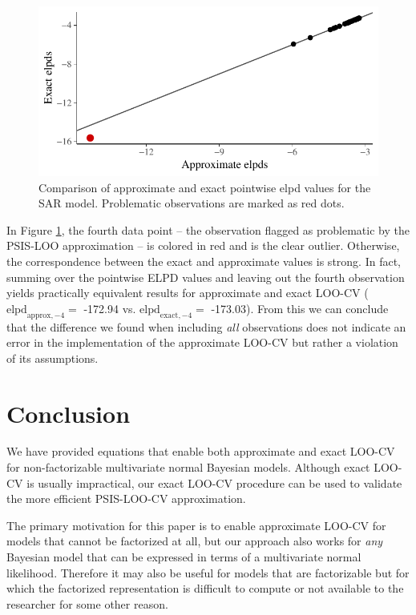 \documentclass[11pt]{article}
\begin{document}
\begin{figure}
\centering
\includegraphics{elpd-compare-1.pdf}
\caption{Comparison of approximate and exact
pointwise elpd values for the SAR model. Problematic observations are
marked as red dots.}
\label{fig:elpd-compare}
\end{figure}

In Figure \ref{fig:elpd-compare}, the fourth data point -- the
observation flagged as problematic by the PSIS-LOO approximation -- is
colored in red and is the clear outlier. Otherwise, the correspondence
between the exact and approximate values is strong. In fact, summing
over the pointwise ELPD values and leaving out the fourth observation
yields practically equivalent results for approximate and exact LOO-CV
(\(\text{elpd}_{\text{approx},-4} =\) -172.94 vs.
\(\text{elpd}_{\text{exact},-4} =\) -173.03). From this we can conclude
that the difference we found when including \emph{all} observations does
not indicate an error in the implementation of the approximate LOO-CV
but rather a violation of its assumptions.


\section{Conclusion}

We have provided equations that enable both approximate and exact LOO-CV for
non-factorizable multivariate normal Bayesian models. Although exact LOO-CV is
usually impractical, our exact LOO-CV procedure can be used to validate the more
efficient PSIS-LOO-CV approximation.

The primary motivation for this paper is to enable approximate LOO-CV for models
that cannot be factorized at all, but our approach also works for \emph{any}
Bayesian model that can be expressed in terms of a multivariate normal
likelihood. Therefore it may also be useful for models that are factorizable but
for which the factorized representation is difficult to compute or not available
to the researcher for some other reason.






\end{document}
